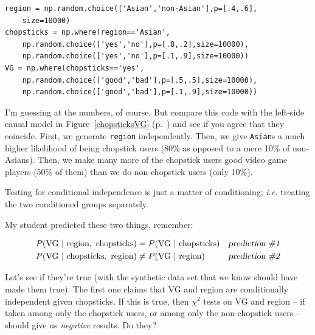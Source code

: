 
\begin{Verbatim}[fontsize=\small,samepage=true,frame=single,framesep=3mm]
region = np.random.choice(['Asian','non-Asian'],p=[.4,.6],
    size=10000)
chopsticks = np.where(region=='Asian',
    np.random.choice(['yes','no'],p=[.8,.2],size=10000),
    np.random.choice(['yes','no'],p=[.1,.9],size=10000))
VG = np.where(chopsticks=='yes',
    np.random.choice(['good','bad'],p=[.5,.5],size=10000),
    np.random.choice(['good','bad'],p=[.1,.9],size=10000))
\end{Verbatim}

I'm guessing at the numbers, of course. But compare this code with the
left-side causal model in Figure~\ref{chopsticksVG} (p.~\pageref{chopsticksVG})
and see if you agree that they coincide. First, we generate \texttt{region}
independently. Then, we give \texttt{Asian}s a much higher likelihood of being
chopstick users (80\% as opposed to a mere 10\% of non-Asians). Then, we make
many more of the chopstick users good video game players (50\% of them) than we
do non-chopstick users (only 10\%).


Testing for conditional independence is just a matter of conditioning;
\textit{i.e.} treating the two conditioned groups separately.

My student predicted these two things, remember:

\vspace{-.2in}
\begin{align*}
P(\textrm{VG}\ |\ \textrm{region},\ \textrm{chopsticks}) &=
P(\textrm{VG}\ |\ \textrm{chopsticks}) & \textsl{prediction \#1} \\
P(\textrm{VG}\ |\ \textrm{chopsticks},\ \textrm{region}) &\neq
P(\textrm{VG}\ |\ \textrm{region}) & \textsl{prediction \#2} \\
\end{align*}
\vspace{-.2in}

Let's see if they're true (with the synthetic data set that we know should have
made them true). The first one claims that \textsf{VG} and \textsf{region} are
conditionally independent given \textsf{chopsticks}. If this is true, then
$\chi ^2$ tests on \textsf{VG} and \textsf{region} -- if taken among only the
chopstick users, or among only the non-chopstick users -- should give us
\textit{negative} results. Do they?

